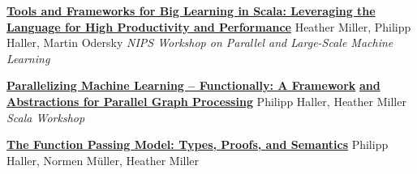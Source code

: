 \documentclass[9pt]{article}
\begin{document}
\noindent\href{http://infoscience.epfl.ch/record/170032}{\bf Tools and Frameworks for Big Learning in Scala: Leveraging the}\vspace{-0.03in}
\newline\noindent\href{http://infoscience.epfl.ch/record/170032}{\bf Language for High Productivity and Performance}
\newline\noindent Heather Miller, Philipp Haller, Martin Odersky
\newline\noindent\emph{NIPS Workshop on Parallel and Large-Scale Machine Learning}
\bigskip

\noindent\href{http://infoscience.epfl.ch/record/165111}{\bf Parallelizing Machine Learning -- Functionally: A Framework}\vspace{-0.03in}
\newline\noindent\href{http://infoscience.epfl.ch/record/165111}{\bf and Abstractions for Parallel Graph Processing}
\newline\noindent Philipp Haller, Heather Miller
\newline\noindent\emph{Scala Workshop}
\bigskip






{}
 \medskip


\noindent\href{https://infoscience.epfl.ch/record/221395}{\bf The Function Passing Model: Types, Proofs, and Semantics}
\newline\noindent Philipp Haller, Normen M\"{u}ller, Heather Miller
\medskip
\end{document}
